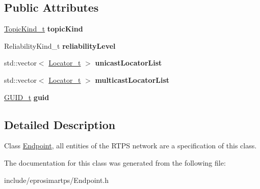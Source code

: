 \subsection*{\-Public \-Attributes}
\begin{DoxyCompactItemize}
\item 
\hypertarget{classeprosima_1_1rtps_1_1_endpoint_ac8d39112adf68c51030914a7d3f8dec1}{\hyperlink{structeprosima_1_1rtps_1_1_topic_kind__t}{\-Topic\-Kind\-\_\-t} {\bfseries topic\-Kind}}\label{classeprosima_1_1rtps_1_1_endpoint_ac8d39112adf68c51030914a7d3f8dec1}

\item 
\hypertarget{classeprosima_1_1rtps_1_1_endpoint_adf6a6a746131f9a5771cb0a4a13474da}{\-Reliability\-Kind\-\_\-t {\bfseries reliability\-Level}}\label{classeprosima_1_1rtps_1_1_endpoint_adf6a6a746131f9a5771cb0a4a13474da}

\item 
\hypertarget{classeprosima_1_1rtps_1_1_endpoint_abb4310af097b263a6ce137beb20aa799}{std\-::vector$<$ \hyperlink{structeprosima_1_1rtps_1_1_locator__t}{\-Locator\-\_\-t} $>$ {\bfseries unicast\-Locator\-List}}\label{classeprosima_1_1rtps_1_1_endpoint_abb4310af097b263a6ce137beb20aa799}

\item 
\hypertarget{classeprosima_1_1rtps_1_1_endpoint_a3256b4ff4ffbbbe1dea8696e18c6c894}{std\-::vector$<$ \hyperlink{structeprosima_1_1rtps_1_1_locator__t}{\-Locator\-\_\-t} $>$ {\bfseries multicast\-Locator\-List}}\label{classeprosima_1_1rtps_1_1_endpoint_a3256b4ff4ffbbbe1dea8696e18c6c894}

\item 
\hypertarget{classeprosima_1_1rtps_1_1_endpoint_aeb0bdefba595457a61f8f74a50558479}{\hyperlink{structeprosima_1_1rtps_1_1_g_u_i_d__t}{\-G\-U\-I\-D\-\_\-t} {\bfseries guid}}\label{classeprosima_1_1rtps_1_1_endpoint_aeb0bdefba595457a61f8f74a50558479}

\end{DoxyCompactItemize}


\subsection{\-Detailed \-Description}
\-Class \hyperlink{classeprosima_1_1rtps_1_1_endpoint}{\-Endpoint}, all entities of the \-R\-T\-P\-S network are a specification of this class. 

\-The documentation for this class was generated from the following file\-:\begin{DoxyCompactItemize}
\item 
include/eprosimartps/\-Endpoint.\-h\end{DoxyCompactItemize}

